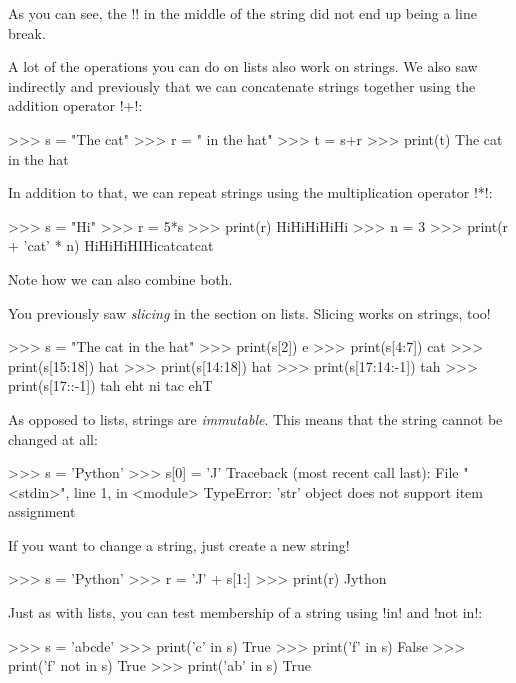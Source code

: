 \documentclass[11pt]{cselabheader}
\begin{document}
As you can see, the \pythoninline!\n! in the middle of the string did not end up
being a line break.

A lot of the operations you can do on lists also work on strings. We also saw
indirectly and previously that we can concatenate strings together using the
addition operator \pythoninline!+!:

\begin{pyconcode}
>>> s = "The cat"
>>> r = " in the hat"
>>> t = s+r
>>> print(t)
The cat in the hat
\end{pyconcode}

In addition to that, we can repeat strings using the multiplication operator
\pythoninline!*!:

\begin{pyconcode}
>>> s = "Hi"
>>> r = 5*s
>>> print(r)
HiHiHiHiHi
>>> n = 3
>>> print(r + 'cat' * n)
HiHiHiHIHicatcatcat
\end{pyconcode}

Note how we can also combine both.

You previously saw \emph{slicing} in the section on lists. Slicing works on strings, too!

\begin{pyconcode}
>>> s = "The cat in the hat"
>>> print(s[2])
e
>>> print(s[4:7])
cat
>>> print(s[15:18])
hat
>>> print(s[14:18])
 hat
>>> print(s[17:14:-1])
tah
>>> print(s[17::-1])
tah eht ni tac ehT
\end{pyconcode}

As opposed to lists, strings are \emph{immutable}. This means that the string
cannot be changed at all:

\begin{pyconcode}
>>> s = 'Python'
>>> s[0] = 'J'
Traceback (most recent call last):
  File "<stdin>", line 1, in <module>
TypeError: 'str' object does not support item assignment
\end{pyconcode}

If you want to change a string, just create a new string!

\begin{pyconcode}
>>> s = 'Python'
>>> r = 'J' + s[1:]
>>> print(r)
Jython
\end{pyconcode}

Just as with lists, you can test membership of a string using \pythoninline!in! and
\pythoninline!not in!:

\begin{pyconcode}
>>> s = 'abcde'
>>> print('c' in s)
True
>>> print('f' in s)
False
>>> print('f' not in s)
True
>>> print('ab' in s)
True
\end{pyconcode}
\end{document}
